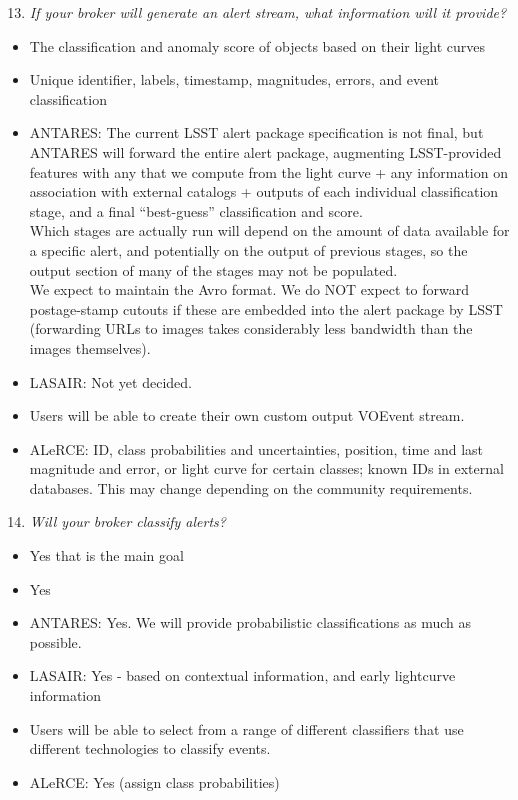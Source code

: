 \documentclass{article}
\begin{document}
\begin{enumerate}
\setcounter{enumi}{12}
\item {\em If your broker will generate an alert stream, what information will it provide?}
\end{enumerate}

\begin{itemize}
\item The classification and anomaly score of objects based on their light curves
\item Unique identifier, labels, timestamp, magnitudes, errors, and event classification
\item ANTARES: The current LSST alert package specification is not final, but ANTARES will forward the entire alert package, augmenting LSST-provided features with any that we compute from the light curve + any information on association with external catalogs + outputs of each individual classification stage, and a final “best-guess” classification and score. \\
Which stages are actually run will depend on the amount of data available for a specific alert, and potentially on the output of previous stages, so the output section of many of the stages may not be populated.  \\
We expect to maintain the Avro format. We do NOT expect to forward postage-stamp cutouts if these are embedded into the alert package by LSST (forwarding URLs to images takes considerably less bandwidth than the images themselves). 
\item LASAIR: Not yet decided. 
\item Users will be able to create their own custom output VOEvent stream.
\item ALeRCE: ID, class probabilities and uncertainties, position, time and last magnitude and error, or light curve for certain classes; known IDs in external databases. This may change depending on the community requirements.
\end{itemize}

\begin{enumerate}
\setcounter{enumi}{13}
\item {\em Will your broker classify alerts?}
\end{enumerate}

\begin{itemize}
\item Yes that is the main goal
\item Yes
\item ANTARES: Yes. We will provide probabilistic classifications as much as possible.
\item LASAIR: Yes - based on contextual information, and early lightcurve information 
\item Users will be able to select from a range of different classifiers that use different technologies to classify events.
\item ALeRCE: Yes (assign class probabilities)
\end{itemize}
\end{document}
